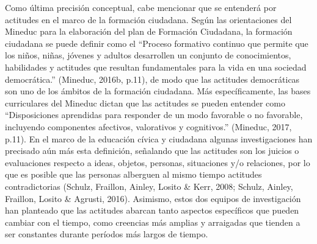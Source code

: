 \documentclass[12pt,twoside]{templates/facsothesis}
\begin{document}
Como última precisión conceptual, cabe mencionar que se entenderá por actitudes en el marco de la formación ciudadana. Según las orientaciones del Mineduc para la elaboración del plan de Formación Ciudadana, la formación ciudadana se puede definir como el ``Proceso formativo continuo que permite que los niños, niñas, jóvenes y adultos desarrollen un conjunto de conocimientos, habilidades y actitudes que resultan fundamentales para la vida en una sociedad democrática.'' (Mineduc, 2016b, p.11), de modo que las actitudes democráticas son uno de los ámbitos de la formación ciudadana. Más específicamente, las bases curriculares del Mineduc dictan que las actitudes se pueden entender como ``Disposiciones aprendidas para responder de un modo favorable o no favorable, incluyendo componentes afectivos, valorativos y cognitivos.'' (Mineduc, 2017, p.11). En el marco de la educación cívica y ciudadana algunas investigaciones han precisado aún más esta definición, señalando que las actitudes son los juicios o evaluaciones respecto a ideas, objetos, personas, situaciones y/o relaciones, por lo que es posible que las personas alberguen al mismo tiempo actitudes contradictorias (Schulz, Fraillon, Ainley, Losito \& Kerr, 2008; Schulz, Ainley, Fraillon, Losito \& Agrusti, 2016). Asimismo, estos dos equipos de investigación han planteado que las actitudes abarcan tanto aspectos específicos que pueden cambiar con el tiempo, como creencias más amplias y arraigadas que tienden a ser constantes durante períodos más largos de tiempo.
\end{document}

